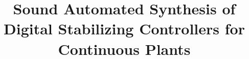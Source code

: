 \documentclass{sig-alternate-05-2015}
\begin{document}

\doi{}

\isbn{}

%

\title{
Sound Automated Synthesis of Digital Stabilizing Controllers for Continuous Plants
}
%
%
%
%
%
\end{document}
